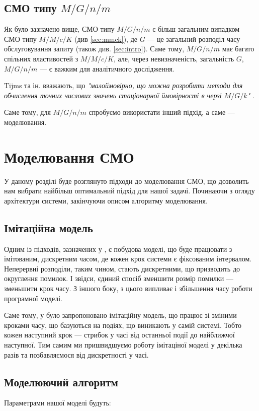 \documentclass[14pt]{extarticle}
\begin{document}
\subsection{СМО типу \(M/G/n/m\)}
Як було зазначено вище, СМО типу \(M/G/n/m\) є більш загальним випадком СМО типу
\(M/M/c/K\) (див \ref{sec:mmck}), де \(G\) --- це загальний розподіл часу обслуговування
запиту (також див. \ref{sec:intro}). Саме тому, \(M/G/n/m\) має багато спільних
властивостей з \(M/M/c/K\), але, через невизначеність, загальність \(G\),
\(M/G/n/m\) --- є важким для аналітичного дослідження.

Tijms та ін. вважають, що \textit{"малоймовірно, що можна розробити методи для
  обчислення точних числових значень стаціонарної ймовірності в черзі
  \(M/G/k\)"} \cite{tijms}.

Саме тому, для \(M/G/n/m\) спробуємо використати інший підхід, а саме ---
моделювання.

\newpage

\section{Моделювання СМО}

У даному розділі буде розглянуто підходи до моделювання СМО, що дозволить нам
вибрати найбільш оптимальний підхід для нашої задачі. Починаючи з огляду
архітектури системи, закінчуючи описом алгоритму моделювання.

\subsection{Імітаційна модель}
Одним із підходів, зазначених у \cite{wiley}, є побудова моделі, що буде працювати з
імітованим, дискретним часом, де кожен крок системи є фіксованим інтервалом.
Неперервні розподіли, таким чином, стають дискретними, що призводить до
округлення помилок. І звідси, єдиний спосіб зменшити розмір помилки --- зменьшити
крок часу. З іншого боку, з цього випливає і збільшення часу роботи програмної
моделі.

Саме тому, у \cite{tits-veeken} було запропоновано імітаційну модель, що працює зі зміними
кроками часу, що базуються на подіях, що виникають у самій системі. Тобто кожен
наступний крок --- стрибок у часі від останньої події до найближчої наступної. Тим
самим ми пришвидшуємо роботу імітаціної моделі у декілька разів та позбавляємося
від дискретності у часі.

\subsection{Моделюючий алгоритм}
Параметрами нашої моделі будуть:
\end{document}
